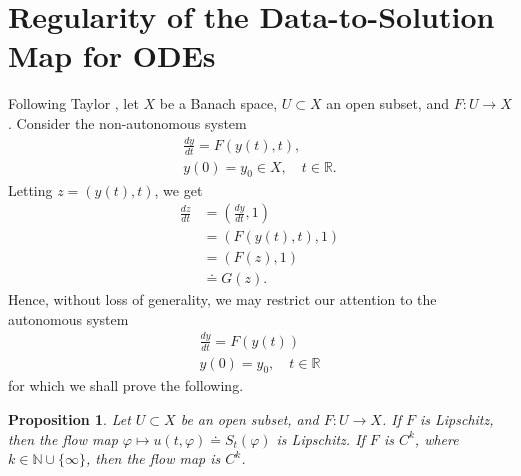 \documentclass[12pt,reqno]{amsart}
\numberwithin{equation}{section}  %
\newcommand{\rr}{\mathbb{R}}
\newcommand{\vp}{\varphi}
\newtheorem{proposition}[theorem]{Proposition}
\begin{document}
\section{Regularity of the Data-to-Solution Map for ODEs} 
\label{sec:dep-param-smooth}
%
%
Following Taylor \cite{Taylor:1995kx}, let $X$ be a Banach space, $U \subset X$ an open subset, and $F: U \to X$. Consider the non-autonomous system
%
%
\begin{gather}
\label{aa-sm}
\frac{dy}{dt} = F(y(t), t),
\\
y(0)= y_{0} \in X, \quad t \in \rr.
\label{bb-sm}
\end{gather}
%
Letting $z = (y(t), t)$, we get
%
%
\begin{equation*}
\begin{split}
\frac{dz}{dt}  
& = \left (\frac{dy}{dt}, 1 \right )
\\
& = \left( F(y(t), t), 1 \right)
\\
& = \left( F(z), 1 \right)
\\
& \doteq G(z).
\end{split}
\end{equation*}
%
%
Hence, without loss of generality, we may restrict our attention to the
autonomous system
%
%
\begin{gather}
\frac{dy}{dt} = F\left( y(t) \right)
\label{ode-eq-sm}
\\
y(0) = y_{0}, \quad t \in \rr
\label{ode-init-data-sm}
\end{gather}
%
%
%
for which we shall prove the following.
%
%
%
%
%
%
%
%
\begin{proposition}
Let $U \subset X$ be an open subset, and $F: U  \to X$.
If $F$ is Lipschitz, then the flow map $\vp \mapsto u(t, \vp) \doteq
S_{t}(\vp)$ is Lipschitz. If $F$ is $C^{k}$, where $k \in \mathbb{N} \cup
\{\infty \}$, then the flow map is $C^{k}$.
\label{prop:reg-result}
\end{proposition}
%
%
%
%
\end{document}
